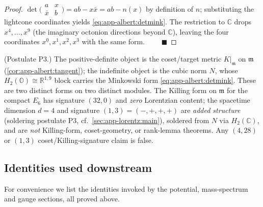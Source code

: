 \begin{proof}
$\det\!\bigl(\begin{smallmatrix}a&x\\\bar x&b\end{smallmatrix}\bigr)
=ab-x\bar x=ab-n(x)$ by definition of $n$; substituting the lightcone
coordinates yields \eqref{eq:app-albert:detmink}. The restriction to
$\mathbb C$ drops $x^4,\dots,x^9$ (the imaginary octonion directions beyond
$\mathbb C$), leaving the four coordinates $x^0,x^1,x^2,x^3$ with the same form.
$\qquad\blacksquare$
\end{proof}

\begin{remark}\label{rmk:app-albert:signature}
\textup{(Postulate P3.)}
The positive-definite object is the coset/target metric $K|_{\mathfrak m}$ on
$\mathfrak m$ (\autoref{cor:app-albert:tangent}); the indefinite object is the
cubic norm $N$, whose $H_2(\mathbb O)\cong\mathbb R^{1,9}$ block carries the
Minkowski form \eqref{eq:app-albert:detmink}. These are two distinct forms on two
distinct modules. The Killing form on $\mathfrak m$ for the compact $E_6$ has
signature $(32,0)$ and \emph{zero} Lorentzian content; the spacetime dimension
$d=4$ and signature $(1,3)=(-,+,+,+)$ are \emph{added structure} (soldering
postulate P3, cf.\ \autoref{sec:app-lorentz:main}), soldered from $N$ via
$H_2(\mathbb C)$, and are \emph{not} Killing-form, coset-geometry, or rank-lemma
theorems. Any $(4,28)$ or $(1,3)$ coset/Killing-signature claim is false.
\end{remark}

\subsection{Identities used downstream}
\label{sec:app-albert:identities}

For convenience we list the identities invoked by the potential, mass-spectrum and
gauge sections, all proved above.

